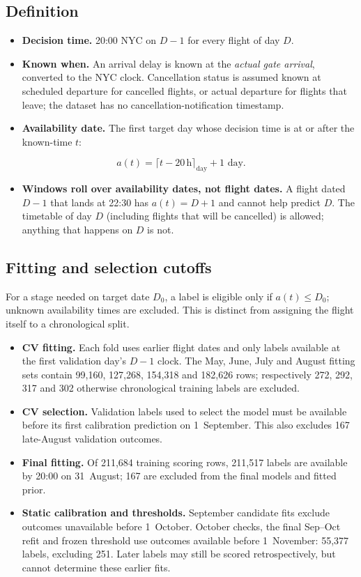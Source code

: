 \documentclass[conference]{IEEEtran}
\begin{document}
\subsection{Definition}
\begin{itemize}
\item \textbf{Decision time.} 20:00 NYC on $D-1$ for every flight of day $D$.
\item \textbf{Known when.} An arrival delay is known at the \emph{actual gate arrival}, converted to the NYC clock. Cancellation status is assumed known at scheduled departure for cancelled flights, or actual departure for flights that leave; the dataset has no cancellation-notification timestamp.
\item \textbf{Availability date.} The first target day whose decision time is at or after the known-time $t$:
\end{itemize}
\[
a(t)=\lceil t-20\,\text{h}\rceil_{\text{day}}+1\text{ day}.
\]
\begin{itemize}
\item \textbf{Windows roll over availability dates, not flight dates.} A flight dated $D-1$ that lands at 22:30 has $a(t)=D+1$ and cannot help predict $D$. The timetable of day $D$ (including flights that will be cancelled) is allowed; anything that happens on $D$ is not.
\end{itemize}

\subsection{Fitting and selection cutoffs}
For a stage needed on target date $D_0$, a label is eligible only if $a(t)\le D_0$; unknown availability times are excluded. This is distinct from assigning the flight itself to a chronological split.
\begin{itemize}
\item \textbf{CV fitting.} Each fold uses earlier flight dates and only labels available at the first validation day's $D-1$ clock. The May, June, July and August fitting sets contain 99{,}160, 127{,}268, 154{,}318 and 182{,}626 rows; respectively 272, 292, 317 and 302 otherwise chronological training labels are excluded.
\item \textbf{CV selection.} Validation labels used to select the model must be available before its first calibration prediction on 1~September. This also excludes 167 late-August validation outcomes.
\item \textbf{Final fitting.} Of 211{,}684 training scoring rows, 211{,}517 labels are available by 20:00 on 31~August; 167 are excluded from the final models and fitted prior.
\item \textbf{Static calibration and thresholds.} September candidate fits exclude outcomes unavailable before 1~October. October checks, the final Sep--Oct refit and frozen threshold use outcomes available before 1~November: 55{,}377 labels, excluding 251. Later labels may still be scored retrospectively, but cannot determine these earlier fits.
\end{itemize}
\end{document}

